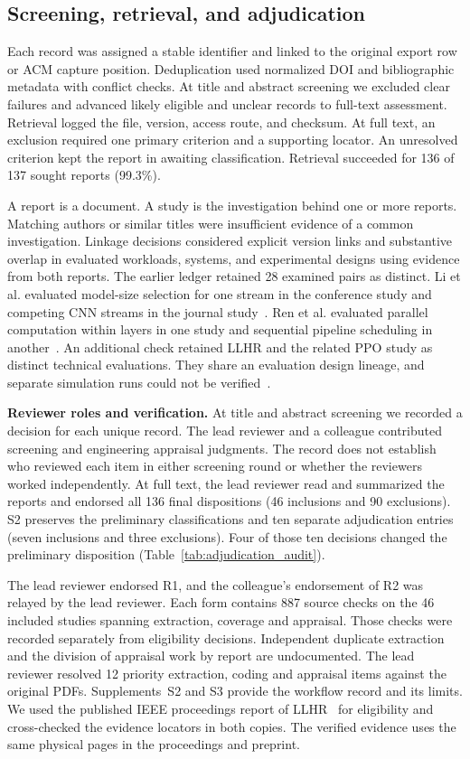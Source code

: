 \documentclass[pdflatex,sn-vancouver-num]{sn-jnl}
\begin{document}
\subsection{Screening, retrieval, and adjudication}
Each record was assigned a stable identifier and linked to the original export row or ACM capture position. Deduplication used normalized DOI and bibliographic metadata with conflict checks. At title and abstract screening we excluded clear failures and advanced likely eligible and unclear records to full-text assessment. Retrieval logged the file, version, access route, and checksum. At full text, an exclusion required one primary criterion and a supporting locator. An unresolved criterion kept the report in awaiting classification. Retrieval succeeded for 136 of 137 sought reports (99.3\%).

A report is a document. A study is the investigation behind one or more reports. Matching authors or similar titles were insufficient evidence of a common investigation. Linkage decisions considered explicit version links and substantive overlap in evaluated workloads, systems, and experimental designs using evidence from both reports. The earlier ledger retained 28 examined pairs as distinct. Li et al. evaluated model-size selection for one stream in the conference study and competing CNN streams in the journal study~\cite{R0003,R0059}. Ren et al. evaluated parallel computation within layers in one study and sequential pipeline scheduling in another~\cite{R0015,R0010}. An additional check retained LLHR and the related PPO study as distinct technical evaluations. They share an evaluation design lineage, and separate simulation runs could not be verified~\cite{R0082,R0019}.

\textbf{Reviewer roles and verification.} At title and abstract screening we recorded a decision for each unique record. The lead reviewer and a colleague contributed screening and engineering appraisal judgments. The record does not establish who reviewed each item in either screening round or whether the reviewers worked independently. At full text, the lead reviewer read and summarized the reports and endorsed all 136 final dispositions (46 inclusions and 90 exclusions). S2 preserves the preliminary classifications and ten separate adjudication entries (seven inclusions and three exclusions). Four of those ten decisions changed the preliminary disposition (Table~\ref{tab:adjudication_audit}).\par The lead reviewer endorsed R1, and the colleague's endorsement of R2 was relayed by the lead reviewer. Each form contains 887 source checks on the 46 included studies spanning extraction, coverage and appraisal. Those checks were recorded separately from eligibility decisions. Independent duplicate extraction and the division of appraisal work by report are undocumented. The lead reviewer resolved 12 priority extraction, coding and appraisal items against the original PDFs. Supplements~S2 and S3 provide the workflow record and its limits. We used the published IEEE proceedings report of LLHR~\cite{R0082} for eligibility and cross-checked the evidence locators in both copies. The verified evidence uses the same physical pages in the proceedings and preprint.
\end{document}
